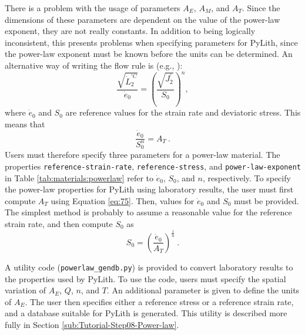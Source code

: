 There is a problem with the usage of parameters $A_{E}$, $A_{M}$,
and $A_{T}$. Since the dimensions of these parameters are dependent
on the value of the power-law exponent, they are not really constants.
In addition to being logically inconsistent, this presents problems
when specifying parameters for PyLith, since the power-law exponent
must be known before the units can be determined. An alternative way
of writing the flow rule is (e.g., \cite{Prentice:1968}): 
\begin{equation}
\frac{\sqrt{\dot{L}_{2}^{\prime C}}}{\dot{e}_{0}}=\left(\frac{\sqrt{J_{2}^{\prime}}}{S_{0}}\right)^{n},\label{eq:76}
\end{equation}
where $\dot{e}_{0}$ and $S_{0}$ are reference values for the strain
rate and deviatoric stress. This means that
\begin{equation}
\frac{\dot{e}_{0}}{S_{0}^{n}}=A_{T}\:.\label{eq:77}
\end{equation}
Users must therefore specify three parameters for a power-law material.
The properties \texttt{reference-strain-rate}, \texttt{reference-stress},
and \texttt{power-law-exponent} in Table \vref{tab:materials:powerlaw} refer
to $\dot{e}_{0}$, $S_{0}$, and $n$, respectively. To specify the
power-law properties for PyLith using laboratory results, the user
must first compute $A_{T}$ using Equation \vref{eq:75}. Then, values
for $\dot{e}_{0}$ and $S_{0}$ must be provided. The simplest method
is probably to assume a reasonable value for the reference strain
rate, and then compute $S_{0}$ as
\begin{equation}
S_{0}=\left(\frac{\dot{e}_{0}}{A_{T}}\right)^{\frac{1}{n}}\:.\label{eq:78}
\end{equation}

A utility code (\texttt{powerlaw\_gendb.py}) is provided to convert
laboratory results to the properties used by PyLith. To use the code,
users must specify the spatial variation of $A_{E}$, $Q$, $n$,
and $T$. An additional parameter is given to define the units of
$A_{E}$. The user then specifies either a reference stress or a reference
strain rate, and a database suitable for PyLith is generated. This
utility is described more fully in Section \vref{sub:Tutorial-Step08-Power-law}.

